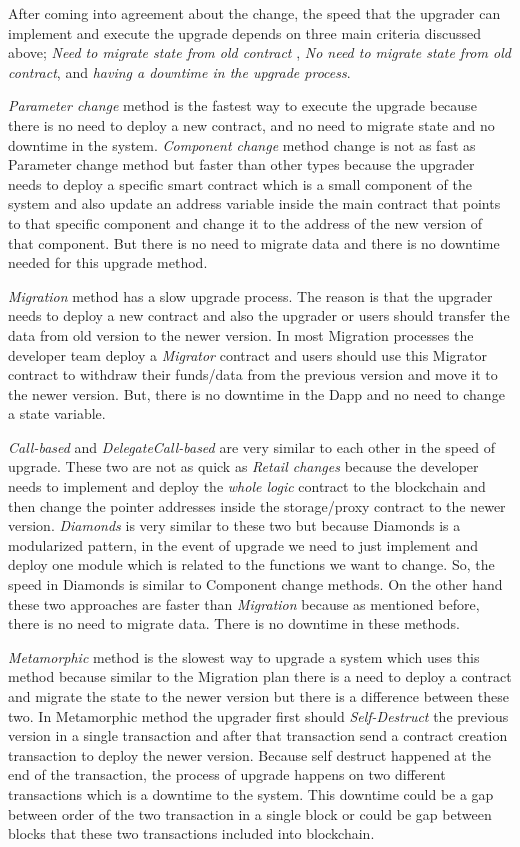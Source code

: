 After coming into agreement about the change, the speed that the upgrader can implement and execute the upgrade depends on three main criteria discussed above; \textit{Need to migrate state from old contract} , \textit{No need to migrate state from old contract}, and \textit{having a downtime in the upgrade process}.
 
\textit{Parameter change} method is the fastest way to execute the upgrade because there is no need to deploy a new contract, and no need to migrate state and no downtime in the system.
\textit{Component change} method change is not as fast as Parameter change method but faster than other types because the upgrader needs to deploy a specific smart contract which is a small component of the system and also update an address variable inside the main contract that points to that specific component and change it to the address of the new version of that component. But there is no need to migrate data and there is no downtime needed for this upgrade method.

\textit{Migration} method has a slow upgrade process. The reason is that the upgrader needs to deploy a new contract and also the upgrader or users should transfer the data from old version to the newer version. In most Migration processes the developer team deploy a \textit{Migrator} contract and users should use this Migrator contract to withdraw their funds/data from the previous version and move it to the newer version. But, there is no downtime in the Dapp and no need to change a state variable.

\textit{Call-based} and \textit{DelegateCall-based} are very similar to each other in the speed of upgrade. These two are not as quick as \textit{Retail changes} because the developer needs to implement and deploy the \textit{whole logic} contract to the blockchain and then change the pointer addresses inside the storage/proxy contract to the newer version. \textit{Diamonds} is very similar to these two but because Diamonds is a modularized pattern, in the event of upgrade we need to just implement and deploy one module which is related to the functions we want to change. So, the speed in Diamonds is similar to Component change methods.
On the other hand these two approaches are faster than \textit{Migration} because as mentioned before, there is no need to migrate data. There is no downtime in these methods.

\textit{Metamorphic} method is the slowest way to upgrade a system which uses this method because similar to the Migration plan there is a need to deploy a contract and migrate the state to the newer version but there is a difference between these two. In Metamorphic method the upgrader first should \textit{Self-Destruct} the previous version in a single transaction and after that transaction send a contract creation transaction to deploy the newer version. Because self destruct happened at the end of the transaction, the process of upgrade happens on two different transactions which is a downtime to the system. This downtime could be a gap between order of the two transaction in a single block or could be gap between blocks that these two transactions included into blockchain. 



